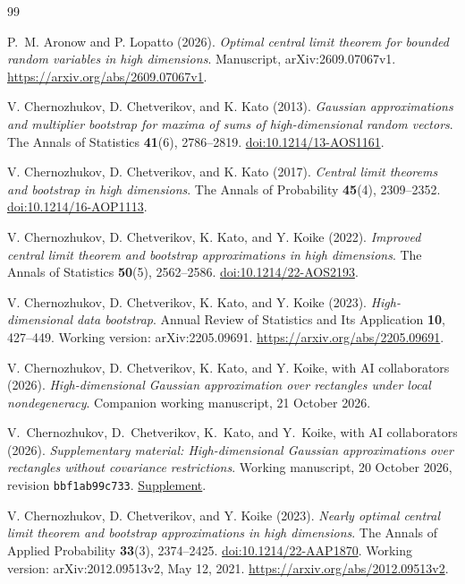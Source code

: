 \documentclass[11pt,letterpaper]{article}
\theoremstyle{remark}
\begin{document}
\begin{thebibliography}{99}
{}
P.~M. Aronow and P. Lopatto (2026).
\emph{Optimal central limit theorem for bounded random variables in high dimensions}.
Manuscript, arXiv:2609.07067v1.
\url{https://arxiv.org/abs/2609.07067v1}.

V. Chernozhukov, D. Chetverikov, and K. Kato (2013).
\emph{Gaussian approximations and multiplier bootstrap for maxima of
sums of high-dimensional random vectors}.
The Annals of Statistics \textbf{41}(6), 2786--2819.
\href{https://doi.org/10.1214/13-AOS1161}{doi:10.1214/13-AOS1161}.

V. Chernozhukov, D. Chetverikov, and K. Kato (2017).
\emph{Central limit theorems and bootstrap in high dimensions}.
The Annals of Probability \textbf{45}(4), 2309--2352.
\href{https://doi.org/10.1214/16-AOP1113}{doi:10.1214/16-AOP1113}.

V. Chernozhukov, D. Chetverikov, K. Kato, and Y. Koike (2022).
\emph{Improved central limit theorem and bootstrap approximations in
high dimensions}. The Annals of Statistics \textbf{50}(5), 2562--2586.
\href{https://doi.org/10.1214/22-AOS2193}{doi:10.1214/22-AOS2193}.

V. Chernozhukov, D. Chetverikov, K. Kato, and Y. Koike (2023).
\emph{High-dimensional data bootstrap}.
Annual Review of Statistics and Its Application \textbf{10}, 427--449.
Working version: arXiv:2205.09691.
\url{https://arxiv.org/abs/2205.09691}.

V. Chernozhukov, D. Chetverikov, K. Kato, and Y. Koike,
with AI collaborators (2026).
\emph{High-dimensional Gaussian approximation over rectangles under
local nondegeneracy}. Companion working manuscript, 21 October 2026.

V.~Chernozhukov, D.~Chetverikov, K.~Kato, and Y.~Koike,
with AI collaborators (2026).
\emph{Supplementary material: High-dimensional Gaussian approximations
over rectangles without covariance restrictions}.
Working manuscript, 20 October 2026, revision \texttt{bbf1ab99c733}.
\href{https://github.com/VC2015/HDCLTs/blob/bbf1ab99c733a398c181ca8c9f5a243a41f258c6/research-rectangle-clt-singular/Rectangle_CLT_Supplement.pdf}{Supplement}.

V. Chernozhukov, D. Chetverikov, and Y. Koike (2023).
\emph{Nearly optimal central limit theorem and bootstrap approximations
in high dimensions}.
The Annals of Applied Probability \textbf{33}(3), 2374--2425.
\href{https://doi.org/10.1214/22-AAP1870}{doi:10.1214/22-AAP1870}.
Working version: arXiv:2012.09513v2, May 12, 2021.
\url{https://arxiv.org/abs/2012.09513v2}.


\end{thebibliography}
\end{document}
